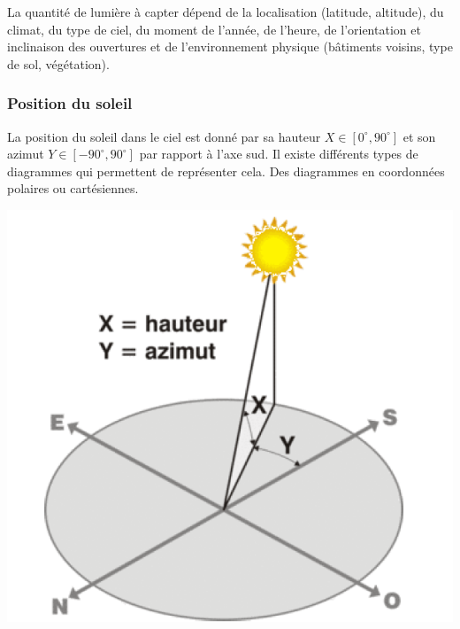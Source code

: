 \documentclass[11pt]{report}
\begin{document}
 La quantité de lumière à capter dépend de la localisation (latitude, altitude), du climat, du type de ciel, du moment de l'année, de l'heure, de l'orientation et inclinaison des ouvertures et de l'environnement physique (bâtiments voisins, type de sol, végétation).


\subsubsection{Position du soleil}
\begin{minipage}{0.7\linewidth}
La position du soleil dans le ciel est donné par sa hauteur $X \in [0^{\circ},90^{\circ}]$ et son azimut $Y\in [-90^{\circ},90^{\circ}]$ par rapport à l'axe sud. 
Il existe différents types de diagrammes qui permettent de représenter cela. Des diagrammes en coordonnées polaires ou cartésiennes.
\end{minipage}
\begin{minipage}{0.3\linewidth}
\centering
\includegraphics[scale=0.17]{az}
\end{minipage}
\end{document}
